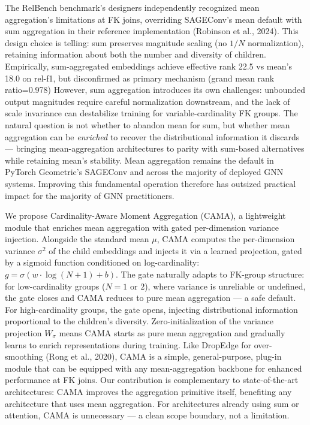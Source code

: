 \documentclass[final]{article}
\begin{document}
The RelBench benchmark's designers independently recognized mean aggregation's limitations at FK joins, overriding SAGEConv's mean default with sum aggregation in their reference implementation (Robinson et al., 2024). This design choice is telling: sum preserves magnitude scaling (no $1/N$ normalization), retaining information about both the number and diversity of children. Empirically, sum-aggregated embeddings achieve effective rank 22.5 vs mean's 18.0 on rel-f1, but disconfirmed as primary mechanism (grand mean rank ratio=0.978) However, sum aggregation introduces its own challenges: unbounded output magnitudes require careful normalization downstream, and the lack of scale invariance can destabilize training for variable-cardinality FK groups. The natural question is not whether to abandon mean for sum, but whether mean aggregation can be \textit{enriched} to recover the distributional information it discards --- bringing mean-aggregation architectures to parity with sum-based alternatives while retaining mean's stability. Mean aggregation remains the default in PyTorch Geometric's SAGEConv and across the majority of deployed GNN systems. Improving this fundamental operation therefore has outsized practical impact for the majority of GNN practitioners.

We propose Cardinality-Aware Moment Aggregation (CAMA), a lightweight module that enriches mean aggregation with gated per-dimension variance injection. Alongside the standard mean $\mu$, CAMA computes the per-dimension variance $\sigma^2$ of the child embeddings and injects it via a learned projection, gated by a sigmoid function conditioned on log-cardinality: $g = \sigma(w \cdot \log(N{+}1) + b)$. The gate naturally adapts to FK-group structure: for low-cardinality groups ($N = 1$ or $2$), where variance is unreliable or undefined, the gate closes and CAMA reduces to pure mean aggregation --- a safe default. For high-cardinality groups, the gate opens, injecting distributional information proportional to the children's diversity. Zero-initialization of the variance projection $W_\sigma$ means CAMA starts as pure mean aggregation and gradually learns to enrich representations during training. Like DropEdge for over-smoothing (Rong et al., 2020), CAMA is a simple, general-purpose, plug-in module that can be equipped with any mean-aggregation backbone for enhanced performance at FK joins. Our contribution is complementary to state-of-the-art architectures: CAMA improves the aggregation primitive itself, benefiting any architecture that uses mean aggregation. For architectures already using sum or attention, CAMA is unnecessary --- a clean scope boundary, not a limitation.
\end{document}
